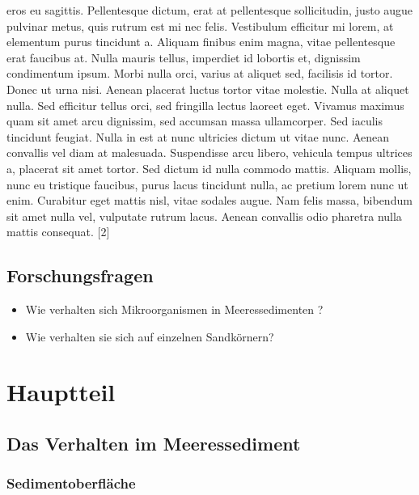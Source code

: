 \documentclass[
  ngerman,
  14pt,
  a4paper,
  DIV=11,
  twoside]{scrreprt}
\providecommand{\tightlist}{%
  \setlength{\itemsep}{0pt}\setlength{\parskip}{0pt}}
\begin{document}
eros eu sagittis. Pellentesque dictum, erat at pellentesque
sollicitudin, justo augue pulvinar metus, quis rutrum est mi nec felis.
Vestibulum efficitur mi lorem, at elementum purus tincidunt a. Aliquam
finibus enim magna, vitae pellentesque erat faucibus at. Nulla mauris
tellus, imperdiet id lobortis et, dignissim condimentum ipsum. Morbi
nulla orci, varius at aliquet sed, facilisis id tortor. Donec ut urna
nisi. Aenean placerat luctus tortor vitae molestie. Nulla at aliquet
nulla. Sed efficitur tellus orci, sed fringilla lectus laoreet eget.
Vivamus maximus quam sit amet arcu dignissim, sed accumsan massa
ullamcorper. Sed iaculis tincidunt feugiat. Nulla in est at nunc
ultricies dictum ut vitae nunc. Aenean convallis vel diam at malesuada.
Suspendisse arcu libero, vehicula tempus ultrices a, placerat sit amet
tortor. Sed dictum id nulla commodo mattis. Aliquam mollis, nunc eu
tristique faucibus, purus lacus tincidunt nulla, ac pretium lorem nunc
ut enim. Curabitur eget mattis nisl, vitae sodales augue. Nam felis
massa, bibendum sit amet nulla vel, vulputate rutrum lacus. Aenean
convallis odio pharetra nulla mattis consequat. {[}2{]}

\section{Forschungsfragen}\label{forschungsfragen}

\begin{itemize}
\tightlist
\item
  Wie verhalten sich Mikroorganismen in Meeressedimenten ?
\item
  Wie verhalten sie sich auf einzelnen Sandkörnern?
\end{itemize}


\chapter{Hauptteil}\label{hauptteil}

\section{Das Verhalten im
Meeressediment}\label{das-verhalten-im-meeressediment}

\subsection{Sedimentoberfläche}\label{sedimentoberfluxe4che}
\end{document}
